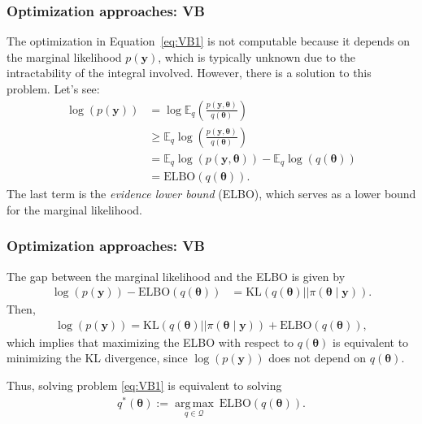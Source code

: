 \documentclass[12pt, compress]{beamer}
\DeclareMathOperator*{\argmax}{arg\,max}
\begin{document}
\begin{frame}
	\frametitle{Optimization approaches: VB}
The optimization in Equation~\ref{eq:VB1} is not computable because it depends on the marginal likelihood $p(\boldsymbol{y})$, which is typically unknown due to the intractability of the integral involved. However, there is a solution to this problem. Let’s see:
\begin{align*}
	\log(p(\boldsymbol{y}))&=\log \mathbb{E}_q\left(\frac{p(\boldsymbol{y}, \boldsymbol{\theta})}{q(\boldsymbol{\theta})}\right)\\
	&\geq \mathbb{E}_q\log\left(\frac{p(\boldsymbol{y}, \boldsymbol{\theta})}{q(\boldsymbol{\theta})}\right)\\
	&=\mathbb{E}_q\log(p(\boldsymbol{y}, \boldsymbol{\theta}))-\mathbb{E}_q\log(q(\boldsymbol{\theta}))\\
	&=\text{ELBO}(q(\boldsymbol{\theta})).
\end{align*}
The last term is the \textit{evidence lower bound} (ELBO), which serves as a lower bound for the marginal likelihood. 
\end{frame}

\begin{frame}
	\frametitle{Optimization approaches: VB}
The gap between the marginal likelihood and the ELBO is given by
\begin{align*}
	\log(p(\boldsymbol{y})) - \text{ELBO}(q(\boldsymbol{\theta}))
	&=\text{KL}(q(\boldsymbol{\theta})||\pi(\boldsymbol{\theta} \mid \mathbf{y})).	 
\end{align*}
Then,
\begin{align*}
	\log(p(\boldsymbol{y})) = \text{KL}(q(\boldsymbol{\theta})||\pi(\boldsymbol{\theta} \mid \mathbf{y})) + \text{ELBO}(q(\boldsymbol{\theta})),  
\end{align*} 
which implies that maximizing the ELBO with respect to $q(\boldsymbol{\theta})$ is equivalent to minimizing the KL divergence, since $\log(p(\boldsymbol{y}))$ does not depend on $q(\boldsymbol{\theta})$.

Thus, solving problem \ref{eq:VB1} is equivalent to solving
\begin{align}\label{eq:VB2}
	q^*(\boldsymbol{\theta}):=\underset{q \in \mathcal{Q}}{\argmax} \  \text{ELBO}(q(\boldsymbol{\theta})).
\end{align}
\end{frame}
\end{document}
